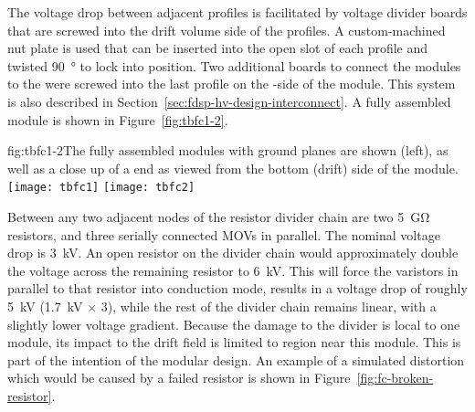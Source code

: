 The voltage drop between adjacent profiles is facilitated by voltage divider boards that are screwed into the drift volume side of the profiles. A custom-machined nut plate is used that can be inserted into the open slot of each profile and twisted \SI{90}{\degree} %
to lock into position. Two additional boards to connect the modules to the  were screwed into the last profile on the -side of the module. This system is also described in Section~\ref{sec:fdsp-hv-design-interconnect}. A fully assembled module is shown in Figure~\ref{fig:tbfc1-2}.

\begin{dunefigure}{fig:tbfc1-2}{The fully assembled modules with ground planes are shown (left), as well as a close up of a  end as viewed from the bottom (drift) side of the module.}
\texttt{[image: tbfc1]}
\texttt{[image: tbfc2]}
\end{dunefigure}

Between any two adjacent nodes of the resistor divider chain are two \SI{5}{\giga\ohm} resistors, and three serially connected MOVs in parallel.  The nominal voltage drop is \SI{3}{kV}.
An open resistor on the divider chain would approximately double the voltage across the remaining resistor to \SI{6}{kV}.  This will force the varistors in parallel to that resistor into conduction mode, results in a voltage drop of roughly \SI{5}{kV} (\SI{1.7}{kV} $\times$ \num{3}), while the rest of the divider chain remains linear, with a slightly lower voltage gradient.
Because the damage to the divider is local to one module, its impact to the  drift field is limited to region near this module.  This is part of the intention of the modular design.
An example of a simulated \efield{} distortion which would be caused by a failed resistor is shown in Figure~\ref{fig:fc-broken-resistor}. 

